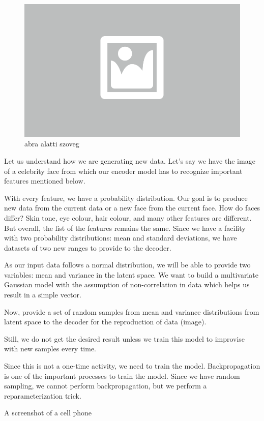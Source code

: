 \begin{figure}[h]
	\centering
	\includegraphics[width=0.65\columnwidth]{figures/abra.png}
	\caption{abra alatti szoveg}
\end{figure}

Let us understand how we are generating new data. Let’s say we have the image of a celebrity face from which our encoder model has to recognize important features mentioned below. 

With every feature, we have a probability distribution. Our goal is to produce new data from the current data or a new face from the current face. How do faces differ? Skin tone, eye colour, hair colour, and many other features are different. But overall, the list of the features remains the same. Since we have a facility with two probability distributions: mean and standard deviations, we have datasets of two new ranges to provide to the decoder.

As our input data follows a normal distribution, we will be able to provide two variables: mean and variance in the latent space. We want to build a multivariate Gaussian model with the assumption of non-correlation in data which helps us result in a simple vector.

Now, provide a set of random samples from mean and variance distributions from latent space to the decoder for the reproduction of data (image).

Still, we do not get the desired result unless we train this model to improvise with new samples every time.

Since this is not a one-time activity, we need to train the model. Backpropagation is one of the important processes to train the model. Since we have random sampling, we cannot perform backpropagation, but we perform a reparameterization trick. 



A screenshot of a cell phone

